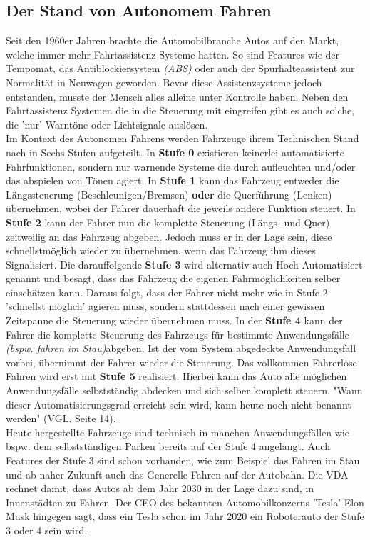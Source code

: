 \subsection{Der Stand von Autonomem Fahren}
Seit den 1960er Jahren brachte die Automobilbranche Autos auf den Markt, welche immer mehr Fahrtassistenz Systeme hatten. So sind Features wie der Tempomat, das Antiblockiersystem \textit{(ABS)} oder auch der Spurhalteassistent zur Normalität in Neuwagen geworden. Bevor diese Assistenzsysteme jedoch entstanden, musste der Mensch alles alleine unter Kontrolle haben. Neben den Fahrtassistenz Systemen die in die Steuerung mit eingreifen gibt es auch solche, die 'nur' Warntöne oder Lichtsignale auslösen.\\
Im Kontext des Autonomen Fahrens werden Fahrzeuge ihrem Technischen Stand nach in Sechs Stufen aufgeteilt.\cite{b25} In \textbf{Stufe 0} existieren keinerlei automatisierte Fahrfunktionen, sondern nur warnende Systeme die durch aufleuchten und/oder das abspielen von Tönen agiert. In \textbf{Stufe 1} kann das Fahrzeug entweder die Längssteuerung (Beschleunigen/Bremsen) \textbf{oder} die Querführung (Lenken) übernehmen, wobei der Fahrer dauerhaft die jeweils andere Funktion steuert. In \textbf{Stufe 2} kann der Fahrer nun die komplette Steuerung (Längs- und Quer) zeitweilig an das Fahrzeug abgeben. Jedoch muss er in der Lage sein, diese schnellstmöglich wieder zu übernehmen, wenn das Fahrzeug ihm dieses Signalisiert.
Die darauffolgende \textbf{Stufe 3} wird alternativ auch Hoch-Automatisiert genannt und besagt, dass das Fahrzeug die eigenen Fahrmöglichkeiten selber einschätzen kann. Daraus folgt, dass der Fahrer nicht mehr wie in Stufe 2 'schnellst möglich' agieren muss, sondern stattdessen nach einer gewissen Zeitspanne die Steuerung wieder übernehmen muss. In der\textbf{ Stufe 4} kann der Fahrer die komplette Steuerung des Fahrzeugs für bestimmte Anwendungsfälle \textit{(bspw. fahren im Stau)}abgeben. Ist der vom System abgedeckte Anwendungsfall vorbei, übernimmt der Fahrer wieder die Steuerung. Das vollkommen Fahrerlose Fahren wird erst mit \textbf{Stufe 5} realisiert. Hierbei kann das Auto alle möglichen Anwendungsfälle selbstständig abdecken und sich selber komplett steuern. "Wann dieser Automatisierungsgrad erreicht sein wird, kann heute noch nicht benannt werden" (VGL. \cite{b25} Seite 14).\\
Heute hergestellte Fahrzeuge sind technisch in manchen Anwendungsfällen wie bspw. dem selbstständigen Parken bereits auf der Stufe 4 angelangt.\cite{b25} Auch Features der Stufe 3 sind schon vorhanden, wie zum Beispiel das Fahren im Stau und ab naher Zukunft auch das Generelle Fahren auf der Autobahn. Die VDA rechnet damit, dass Autos ab dem Jahr 2030 in der Lage dazu sind, in Innenstädten zu Fahren. Der CEO des bekannten Automobilkonzerns 'Tesla' Elon Musk hingegen sagt, dass ein Tesla schon im Jahr 2020 ein Roboterauto der Stufe 3 oder 4 sein wird.\cite{b28}\\
